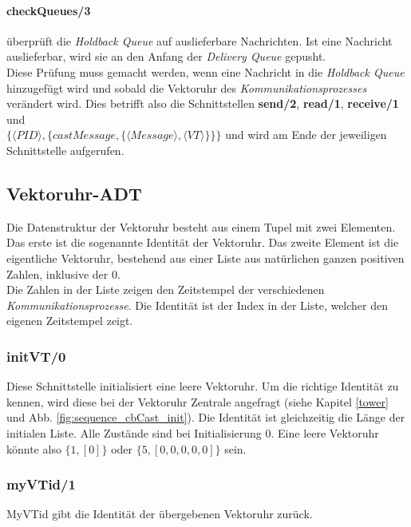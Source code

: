 \paragraph{checkQueues/3} überprüft die \textit{Holdback Queue} auf auslieferbare Nachrichten. Ist eine Nachricht auslieferbar, wird sie an den Anfang der \textit{Delivery Queue} gepusht.\\
Diese Prüfung muss gemacht werden, wenn eine Nachricht in die \textit{Holdback Queue} hinzugefügt wird und sobald die Vektoruhr des \textit{Kommunikationsprozesses} verändert wird. Dies betrifft also die Schnittstellen \textbf{send/2}, \textbf{read/1}, \textbf{receive/1} und\\ $\{\langle PID \rangle,\{castMessage,\{\langle Message \rangle, \langle VT \rangle\}\}\}$ und wird am Ende der jeweiligen Schnittstelle aufgerufen.

\subsection{Vektoruhr-ADT}

Die Datenstruktur der Vektoruhr besteht aus einem Tupel mit zwei Elementen. Das erste ist die sogenannte Identität der Vektoruhr. Das zweite Element ist die eigentliche Vektoruhr, bestehend aus einer Liste aus natürlichen ganzen positiven Zahlen, inklusive der 0.\\
Die Zahlen in der Liste zeigen den Zeitstempel der verschiedenen \textit{Kommunikationsprozesse}. Die Identität ist der Index in der Liste, welcher den eigenen Zeitstempel zeigt.

\subsubsection{initVT/0}

Diese Schnittstelle initialisiert eine leere Vektoruhr. Um die richtige Identität zu kennen, wird diese bei der Vektoruhr Zentrale angefragt (siehe Kapitel \ref{tower} und Abb. \ref{fig:sequence_cbCast_init}). Die Identität ist gleichzeitig die Länge der initialen Liste. Alle Zustände sind bei Initialisierung 0. Eine leere Vektoruhr könnte also $\{1, [0]\}$ oder $\{5, [0,0,0,0,0]\}$ sein.

\subsubsection{myVTid/1}

MyVTid gibt die Identität der übergebenen Vektoruhr zurück. 

